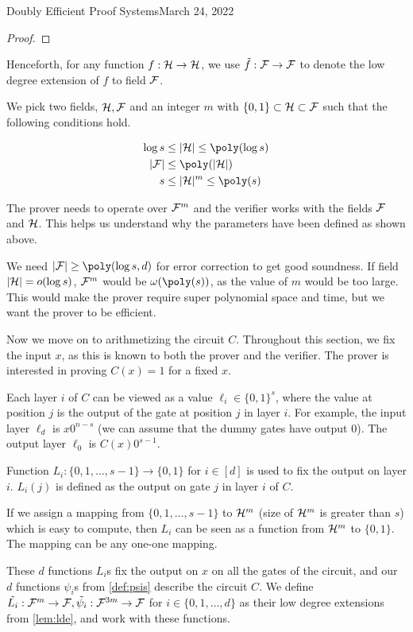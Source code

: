 \begin{lecture}{9}{Doubly Efficient Proof Systems}{March 24, 2022}
\begin{proof}
\end{proof}

Henceforth, for any function $f: \mathcal{H} \rightarrow \mathcal{H}$, we use $\tilde{f}:\mathcal{F} \rightarrow \mathcal{F}$ to denote the low degree extension of $f$ to field $\mathcal{F}$.

We pick two fields, $\mathcal{H}, \mathcal{F}$ and an integer $m$ with $\{0,1\} \subset \mathcal{H} \subset \mathcal{F}$ such that the following conditions hold.

\begin{align*}
\log s &\leq |\fH| \leq \poly(\log s) \\
|\F| &\leq \poly(|\fH|) \\
s &\leq |\fH|^m \leq \poly(s)
\end{align*}

The prover needs to operate over $\mathcal{F}^m$ and the verifier works with the fields $\mathcal{F}$ and $\mathcal{H}$. This helps us understand why the parameters have been defined as shown above. 

We need $|\F| \geq \poly(\log s, d)$ for error correction to get good soundness. If field $|\mathcal{H}| = o(\log s)$, $\mathcal{F}^m$ would be $\omega(\poly(s))$, as the value of $m$ would be too large. This would make the prover require super polynomial space and time, but we want the prover to be efficient.  
 

Now we move on to arithmetizing the circuit $C$. Throughout this section, we fix the input $x$, as this is known to both the prover and the verifier. The prover is interested in proving $C(x)=1$ for a fixed $x$. 

 Each layer $i$ of $C$ can be viewed as a value $\ell_i \in \{0,1\}^{s}$, where the value at position $j$ is the output of the gate at position $j$ in layer $i$. For example, the input layer $\ell_d$ is $x0^{n-s}$ (we can assume that the dummy gates have output 0). The output layer $\ell_0$ is $C(x)0^{s-1}$. 

Function $L_i:\{0,1, \ldots, s-1\} \rightarrow \{0,1\}$ for $i \in [d]$ is used to fix the output on layer $i$. $L_i(j)$ is defined as the output on gate $j$ in layer $i$ of $C$.

If we assign a mapping from $\{0,1, \ldots, s-1\}$ to $\mathcal{H}^m$ (size of $\mathcal{H}^m$ is greater than $s$) which is easy to compute, then $L_i$ can be seen as a function from $\mathcal{H}^m$ to $\{0,1\}$. The mapping can be any one-one mapping. 

These $d$ functions $L_i$s fix the output on $x$ on all the gates of the circuit, and our $d$ functions $\psi_i$s from \cref{def:psis} describe the circuit $C$. We define $\tilde{L_i}: \mathcal{F}^m \rightarrow \mathcal{F}, \tilde{\psi_i}: \mathcal{F}^{3m} \rightarrow \mathcal{F}$ for $i\in \{0,1,\ldots, d\}$ as their low degree extensions from \cref{lem:lde}, and work with these functions.




\end{lecture}
